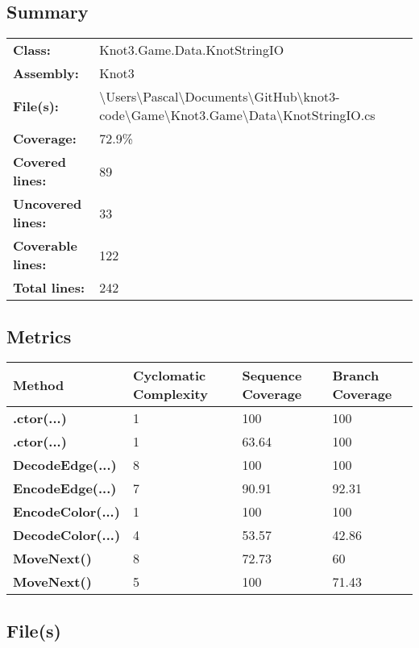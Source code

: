 \documentclass[a4paper,10pt]{article}
\begin{document}
\subsection{Summary}
\begin{longtable}[l]{ll}
\textbf{Class:} & Knot3.Game.Data.KnotStringIO\\
\textbf{Assembly:} & Knot3\\
\textbf{File(s):} & \begin{minipage}[t]{12cm}{\textbackslash Users\textbackslash Pascal\textbackslash Documents\textbackslash GitHub\textbackslash knot3-code\textbackslash Game\textbackslash Knot3.Game\textbackslash Data\textbackslash KnotStringIO.cs}\end{minipage} \\
\textbf{Coverage:} & 72.9\%\\
\textbf{Covered lines:} & 89\\
\textbf{Uncovered lines:} & 33\\
\textbf{Coverable lines:} & 122\\
\textbf{Total lines:} & 242\\
\end{longtable}
\subsection{Metrics}
\begin{longtable}[l]{|l|l|l|l|}
\hline
\textbf{Method} & \textbf{Cyclomatic Complexity} & \textbf{Sequence Coverage} & \textbf{Branch Coverage}\\
\hline
\textbf{.ctor(...)} & 1 & 100 & 100\\
\hline
\textbf{.ctor(...)} & 1 & 63.64 & 100\\
\hline
\textbf{DecodeEdge(...)} & 8 & 100 & 100\\
\hline
\textbf{EncodeEdge(...)} & 7 & 90.91 & 92.31\\
\hline
\textbf{EncodeColor(...)} & 1 & 100 & 100\\
\hline
\textbf{DecodeColor(...)} & 4 & 53.57 & 42.86\\
\hline
\textbf{MoveNext()} & 8 & 72.73 & 60\\
\hline
\textbf{MoveNext()} & 5 & 100 & 71.43\\
\hline
\end{longtable}
\subsection{File(s)}
\end{document}
